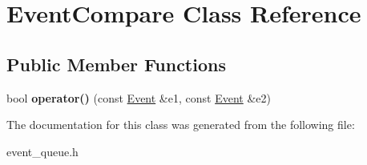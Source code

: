 \hypertarget{class_event_compare}{}\section{Event\+Compare Class Reference}
\label{class_event_compare}
\subsection*{Public Member Functions}
\begin{DoxyCompactItemize}
\item 
\mbox{\label{class_event_compare_aebbe6572247ce934cc40bb34ad4c1d47}} 
bool {\bfseries operator()} (const \hyperlink{class_event}{Event} \&e1, const \hyperlink{class_event}{Event} \&e2)
\end{DoxyCompactItemize}


The documentation for this class was generated from the following file\+:\begin{DoxyCompactItemize}
\item 
event\+\_\+queue.\+h\end{DoxyCompactItemize}

